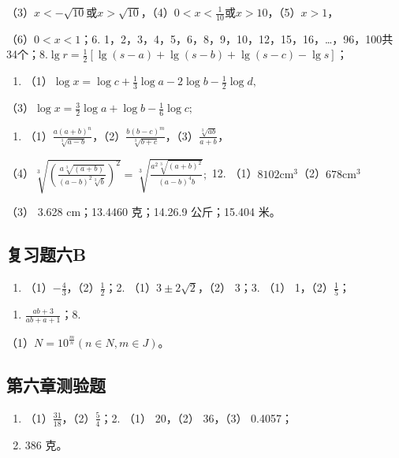 （3）\(x < -\sqrt{10}\)或\(x > \sqrt{10}\)，（4）\(0 < x < \frac{1}{10}\)或\(x > 10\)，（5）\(x > 1\)，

（6）\(0 < x < 1\)；6.
1，2，3，4，5，6，8，9，10，12，15，16，\ldots，96，100共34个；8.\(\lg r = \frac{1}{2} [\lg (s - a) + \lg (s - b) + \lg (s - c) - \lg s]\)；

\begin{enumerate}[start=9]
\item
  （1）\(\log x = \log c + \frac{1}{3}\log a - 2\log b - \frac{1}{2}\log d,\)
\end{enumerate}

（3）\(\log x = \frac{3}{2}\log a + \log b - \frac{1}{6}\log c;\)

\begin{enumerate}[start=10]
\item
  （1）\(\frac{a(a + b)^n}{\sqrt[3]{a - b}}\)，（2）\(\frac{b(b - c)^m}{\sqrt[3]{b + c}}\)，（3）\(\frac{\sqrt[3]{ab}}{a + b}\)，
\end{enumerate}

（4）\(\sqrt[3]{\left(\frac{a\sqrt[3]{(a + b)}}{(a - b)^2\sqrt[3]{b}}\right)^2} = \sqrt[3]{\frac{a^2\sqrt[3]{(a + b)^2}}{(a - b)^4b}};\)
12. （1）\(8102\mathrm{cm}^3\)（2）\(678\mathrm{cm}^3\)

（3） 3.628 cm；13.4460 克；14.26.9 公斤；15.404 米。

\subsection{复习题六B}

\begin{enumerate}
\item
  （1）\(-\frac{4}{3}\)，（2）\(\frac{1}{2}\)；2.
  （1）\(3 \pm 2\sqrt{2}\)，（2） 3；3. （1） 1，（2）\(\frac{1}{5}\)；
\end{enumerate}

\begin{enumerate}[start=5]
\item
  \(\frac{ab + 3}{ab + a + 1}\)；8.
\end{enumerate}
（1）\(N = 10^{\frac{m}{n}} (n \in N, m \in J)\)。

\subsection{第六章测验题}

\begin{enumerate}
\item
  （1）\(\frac{31}{18}\)，（2）\(\frac{5}{4}\)；2. （1） 20，（2）
  36，（3） 0.4057；
\item
  386 克。
\end{enumerate}

